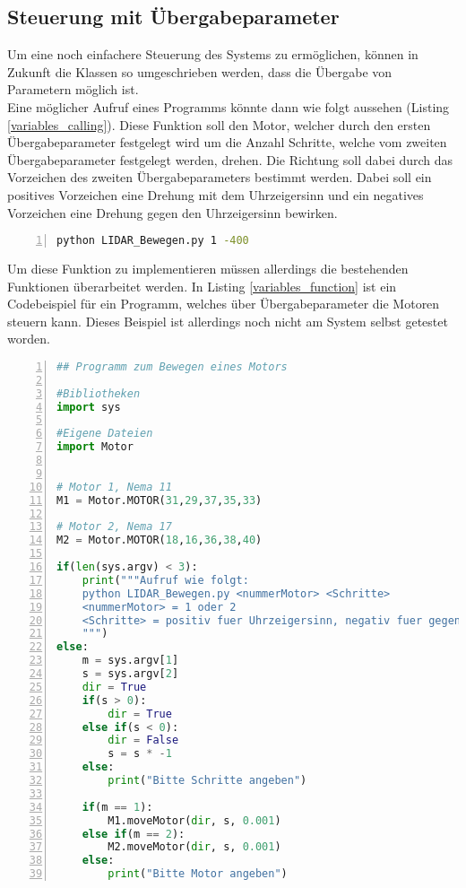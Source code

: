 \subsection{Steuerung mit Übergabeparameter}
Um eine noch einfachere Steuerung des Systems zu ermöglichen, können in Zukunft die Klassen so umgeschrieben werden, dass die Übergabe von Parametern möglich ist.\\
Eine möglicher Aufruf eines Programms könnte dann wie folgt aussehen (Listing \ref{variables_calling}). Diese Funktion soll den Motor, welcher durch den ersten Übergabeparameter festgelegt wird um die Anzahl Schritte, welche vom zweiten Übergabeparameter festgelegt werden, drehen. Die Richtung soll dabei durch das Vorzeichen des zweiten Übergabeparameters bestimmt werden. Dabei soll ein positives Vorzeichen eine Drehung mit dem Uhrzeigersinn und ein negatives Vorzeichen eine Drehung gegen den Uhrzeigersinn bewirken.
\begin{lstlisting}[caption={Beispiel Aufruf einer Pythonfunktion mit Übergabeparametern}, language={bash}, label={variables_calling}, numbers=left]
python LIDAR_Bewegen.py 1 -400
\end{lstlisting}
Um diese Funktion zu implementieren müssen allerdings die bestehenden Funktionen überarbeitet werden. In Listing \ref{variables_function} ist ein Codebeispiel für ein Programm, welches über Übergabeparameter die Motoren steuern kann. Dieses Beispiel ist allerdings noch nicht am System selbst getestet worden.
\newpage  
\begin{lstlisting}[caption={Python Beispielfunktion, welche Übergabeparamenter akzeptiert und ausführt}, language={python}, label={variables_function}, numbers=left]
## Programm zum Bewegen eines Motors

#Bibliotheken
import sys

#Eigene Dateien
import Motor


# Motor 1, Nema 11
M1 = Motor.MOTOR(31,29,37,35,33)

# Motor 2, Nema 17
M2 = Motor.MOTOR(18,16,36,38,40)

if(len(sys.argv) < 3):
    print("""Aufruf wie folgt:
    python LIDAR_Bewegen.py <nummerMotor> <Schritte>
    <nummerMotor> = 1 oder 2
    <Schritte> = positiv fuer Uhrzeigersinn, negativ fuer gegen den Uhrzeigersinn
    """)
else:
    m = sys.argv[1]
    s = sys.argv[2]
    dir = True
    if(s > 0):
        dir = True
    else if(s < 0):
        dir = False
        s = s * -1
    else:
        print("Bitte Schritte angeben")

    if(m == 1):
        M1.moveMotor(dir, s, 0.001)
    else if(m == 2):
        M2.moveMotor(dir, s, 0.001)
    else:
        print("Bitte Motor angeben")

\end{lstlisting}
